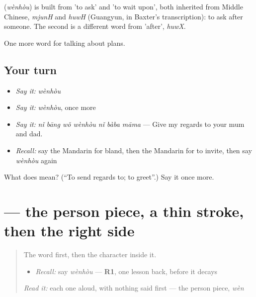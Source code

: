 \begin{cousinweb}
\textbf{} (\emph{wènhòu}) is built from  'to ask' and  'to wait upon', both inherited from Middle Chinese, \emph{mjunH} and \emph{huwH} (Guangyun, in Baxter's transcription): to ask after someone. The second is a different word from  'after', \emph{huwX}.
\end{cousinweb}

\begin{grammarlens}[title={What you've built}]
One more word for talking about plans.
\end{grammarlens}

\subsection*{Your turn}
\begin{itemize}
\raggedright
  \item \emph{Say it:} \emph{wènhòu}
  \item \emph{Say it:} \emph{wènhòu}, once more
  \item \emph{Say it:} \emph{nǐ bāng wǒ wènhòu nǐ bàba māma} — Give my regards to your mum and dad.
  \item \emph{Recall:} say the Mandarin for bland, then the Mandarin for to invite, then say \emph{wènhòu} again
\end{itemize}

\begin{tcolorbox}[breakable,colback=teal!4,colframe=teal!35!black,title={Before you move on}]
What does  mean? (\textquotedblleft{}To send regards to; to greet\textquotedblright{}.) Say it once more.
\end{tcolorbox}
\section[\texorpdfstring{\zh{候} (hòu)}{候 (hòu)}]{ — the person piece, a thin stroke, then the right side}

\label{lesson:ZH-W173-hou-wait}



\begin{quote}
The word first, then the character inside it.

\begin{itemize}
\raggedright
  \item \emph{Recall:} say \emph{wènhòu} — \textbf{R1}, one lesson back, before it decays
\end{itemize}

\begin{quote}
 
\end{quote}

\emph{Read it:} each one aloud, with nothing said first — the person piece, \emph{wèn}
\end{quote}

